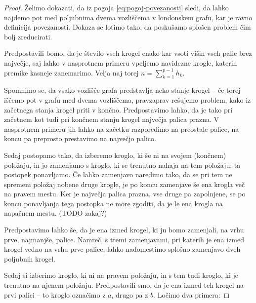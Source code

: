 \documentclass[12pt,a4paper]{amsart}
\theoremstyle{definition} %
\theoremstyle{plain} %
\begin{document}
\begin{proof}
    Želimo dokazati, da iz pogoja \eqref{eq:pogoj-povezanosti} sledi, da lahko najdemo pot med poljubnima dvema vozliščema v londonskem grafu, kar je ravno definicija povezanosti. Dokaza se lotimo tako, da poskušamo splošen problem čim bolj zreducirati.
    
    Predpostavili bomo, da je število vseh krogel enako kar vsoti višin vseh palic brez največje, saj lahko v nasprotnem primeru vpeljemo navidezne krogle, katerih premike kasneje zanemarimo. Velja naj torej $n = \sum_{k=1}^{p-1}h_k$.
    
    Spomnimo se, da vsako vozlišče grafa predstavlja neko stanje krogel -- če torej iščemo pot v grafu med dvema vozliščema, pravzaprav rešujemo problem, kako iz začetnega stanja krogel priti v končno. Predpostavimo lahko, da je tako pri začetnem kot tudi pri končnem stanju krogel največja palica prazna. V nasprotnem primeru jih lahko na začetku razporedimo na preostale palice, na koncu pa preprosto prestavimo na največjo palico.
    
    Sedaj postopamo tako, da izberemo kroglo, ki še ni na svojem (končnem) položaju, in jo zamenjamo s kroglo, ki se trenutno nahaja na tem položaju; ta postopek ponavljamo. Če lahko zamenjavo naredimo tako, da se pri tem ne spremeni položaj nobene druge krogle, je po koncu zamenjave še ena krogla več na pravem mestu.
    Ker je največja palica prazna, vse druge pa zapolnjene, se po koncu ponavljanja tega postopka ne more zgoditi, da je le ena krogla na napačnem mestu. (TODO zakaj?)
    
    Predpostavimo lahko še, da je ena izmed krogel, ki ju bomo zamenjali, na vrhu prve, najmanjše, palice. Namreč, s tremi zamenjavami, pri katerih je ena izmed krogel vedno na vrhu prve palice, lahko nadomestimo splošno zamenjavo dveh poljubnih krogel.
    
    Sedaj si izberimo kroglo, ki ni na pravem položaju, in s tem tudi kroglo, ki je trenutno na njenem položaju. Predpostavili smo, da je ena izmed teh krogel na prvi palici -- to kroglo označimo z $a$, drugo pa z $b$. Ločimo dva primera:
    

\end{proof}
\end{document}
